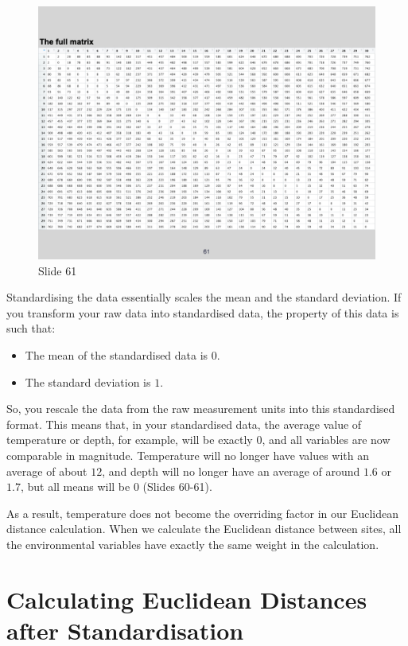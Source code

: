 \documentclass[
  11pt,
]{book}
\providecommand{\tightlist}{%
  \setlength{\itemsep}{0pt}\setlength{\parskip}{0pt}}
\begin{document}
\begin{figure}[ht]
\centering
\includegraphics[width=0.8\linewidth]{../images/BDC334/BDC334-061.jpeg}
\caption*{Slide 61}
\end{figure}

Standardising the data essentially scales the mean and the standard
deviation. If you transform your raw data into standardised data, the
property of this data is such that:

\begin{itemize}
\tightlist
\item
  The mean of the standardised data is \(0\).
\item
  The standard deviation is \(1\).
\end{itemize}

So, you rescale the data from the raw measurement units into this
standardised format. This means that, in your standardised data, the
average value of temperature or depth, for example, will be exactly
\(0\), and all variables are now comparable in magnitude. Temperature
will no longer have values with an average of about \(12\), and depth
will no longer have an average of around \(1.6\) or \(1.7\), but all
means will be \(0\) (Slides 60-61).

As a result, temperature does not become the overriding factor in our
Euclidean distance calculation. When we calculate the Euclidean distance
between sites, all the environmental variables have exactly the same
weight in the calculation.

\section{Calculating Euclidean Distances after
Standardisation}\label{calculating-euclidean-distances-after-standardisation}
\end{document}
